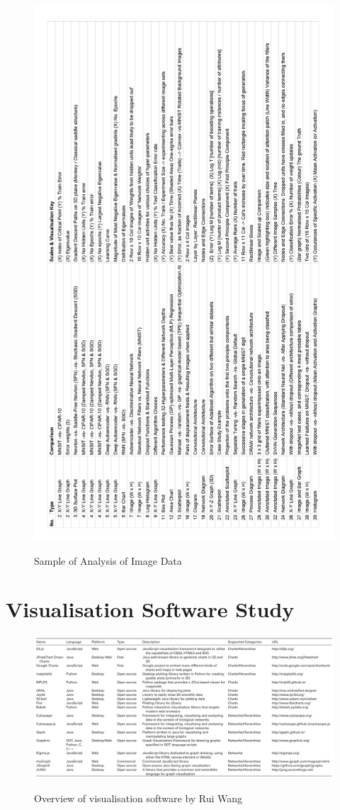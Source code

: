 \documentclass[a4paper,11pt,titlepage]{article}
\begin{document}
		
		\begin{figure}[H]
    			\centering	
		{{\includegraphics[width=14cm]
    				{img/exploration_data_rotate} 
    			}}%
    			\caption{Sample of Analysis of Image Data}%
    		\label{fig:studentprofile}
		\end{figure}
		
		\clearpage
	\section{Visualisation Software Study}		
		\begin{figure}[H]
    			\centering	
		{{\includegraphics[width=18cm]
    				{img/rui_wang_vis_overview} 
    			}}%
    			\caption{Overview of visualisation software by Rui Wang}%
    		\label{fig:studentprofile}
		\end{figure}
\end{document}
